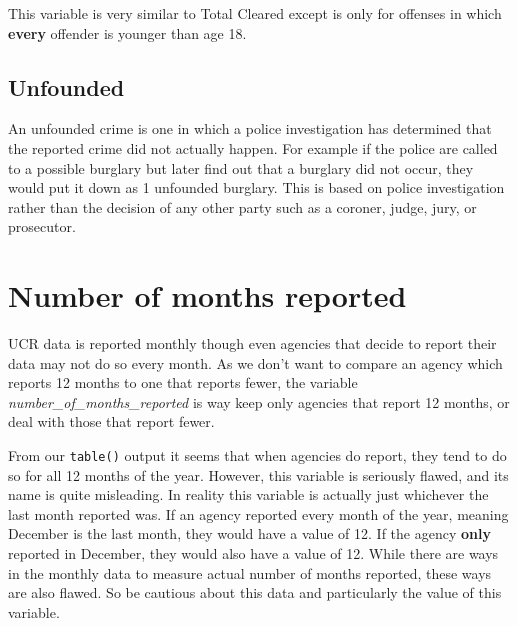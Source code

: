 \documentclass[
  12pt,
]{book}
\newenvironment{Shaded}{\begin{snugshade}}{\end{snugshade}}
\newcommand{\CommentTok}[1]{\textcolor[rgb]{0.37,0.37,0.37}{\textit{#1}}}
\newcommand{\DecValTok}[1]{\textcolor[rgb]{0.06,0.06,0.06}{#1}}
\newcommand{\KeywordTok}[1]{\textcolor[rgb]{0.27,0.27,0.27}{\textbf{#1}}}
\newcommand{\NormalTok}[1]{#1}
\newcommand{\OperatorTok}[1]{\textcolor[rgb]{0.43,0.43,0.43}{\textbf{#1}}}
\begin{document}
This variable is very similar to Total Cleared except is only for offenses in which \textbf{every} offender is younger than age 18.

\hypertarget{unfounded}{%
\subsection{Unfounded}\label{unfounded}}

An unfounded crime is one in which a police investigation has determined that the reported crime did not actually happen. For example if the police are called to a possible burglary but later find out that a burglary did not occur, they would put it down as 1 unfounded burglary. This is based on police investigation rather than the decision of any other party such as a coroner, judge, jury, or prosecutor.

\hypertarget{number-of-months-reported}{%
\section{Number of months reported}\label{number-of-months-reported}}

UCR data is reported monthly though even agencies that decide to report their data may not do so every month. As we don't want to compare an agency which reports 12 months to one that reports fewer, the variable \emph{number\_of\_months\_reported} is way keep only agencies that report 12 months, or deal with those that report fewer.

\begin{Shaded}
\end{Shaded}

From our \texttt{table()} output it seems that when agencies do report, they tend to do so for all 12 months of the year. However, this variable is seriously flawed, and its name is quite misleading. In reality this variable is actually just whichever the last month reported was. If an agency reported every month of the year, meaning December is the last month, they would have a value of 12. If the agency \textbf{only} reported in December, they would also have a value of 12. While there are ways in the monthly data to measure actual number of months reported, these ways are also flawed. So be cautious about this data and particularly the value of this variable.
\end{document}
